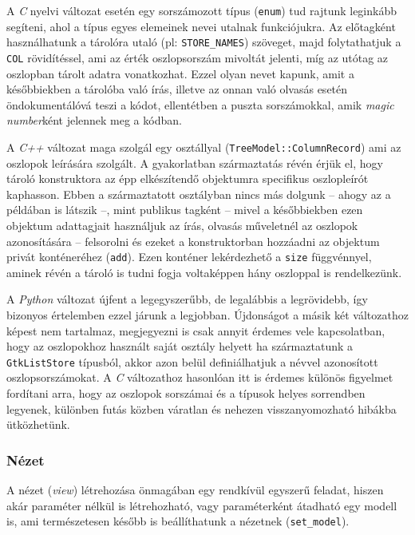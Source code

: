 A \textit{C} nyelvi változat esetén egy sorszámozott típus (\texttt{enum}) tud rajtunk leginkább segíteni, ahol a típus egyes elemeinek nevei utalnak funkciójukra. Az előtagként használhatunk a tárolóra utaló (pl: \texttt{STORE\_NAMES}) szöveget, majd folytathatjuk a \texttt{COL} rövidítéssel, ami az érték oszlopsorszám mivoltát jelenti, míg az utótag az oszlopban tárolt adatra vonatkozhat. Ezzel olyan nevet kapunk, amit a későbbiekben a tárolóba való írás, illetve az onnan való olvasás esetén öndokumentálóvá teszi a kódot, ellentétben a puszta sorszámokkal, amik \textit{magic number}ként jelennek meg a kódban.

A \textit{C++} változat maga szolgál egy osztállyal (\texttt{TreeModel::ColumnRecord}) ami az oszlopok leírására szolgált. A gyakorlatban származtatás révén érjük el, hogy tároló konstruktora az épp elkészítendő objektumra specifikus oszlopleírót kaphasson. Ebben a származtatott osztályban nincs más dolgunk -- ahogy az a példában is látszik --, mint publikus tagként -- mivel a későbbiekben ezen objektum adattagjait használjuk az írás, olvasás műveletnél az oszlopok azonosítására -- felsorolni és ezeket a konstruktorban hozzáadni az objektum privát konténeréhez (\texttt{add}). Ezen konténer lekérdezhető a \texttt{size} függvénnyel, aminek révén a tároló is tudni fogja voltaképpen hány oszloppal is rendelkezünk.

A \textit{Python} változat újfent a legegyszerűbb, de legalábbis a legrövidebb, így bizonyos értelemben ezzel járunk a legjobban. Újdonságot a másik két változathoz képest nem tartalmaz, megjegyezni is csak annyit érdemes vele kapcsolatban, hogy az oszlopokhoz használt saját osztály helyett ha származtatunk a \texttt{GtkListStore} típusból, akkor azon belül definiálhatjuk a névvel azonosított oszlopsorszámokat. A \textit{C} változathoz hasonlóan itt is érdemes különös figyelmet fordítani arra, hogy az oszlopok sorszámai és a típusok helyes sorrendben legyenek, különben futás közben váratlan és nehezen visszanyomozható hibákba ütközhetünk.

\subsubsection{Nézet}

A nézet (\textit{view}) létrehozása önmagában egy rendkívül egyszerű feladat, hiszen akár paraméter nélkül is létrehozható, vagy paraméterként átadható egy modell is, ami természetesen később is beállíthatunk a nézetnek (\texttt{set\_model}).

